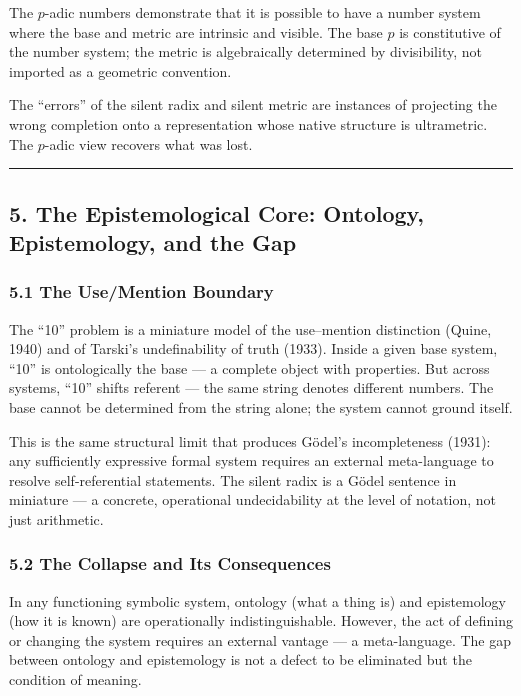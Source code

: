 \documentclass[
]{article}
\begin{document}
The \(p\)-adic numbers demonstrate that it is possible to have a number
system where the base and metric are intrinsic and visible. The base
\(p\) is constitutive of the number system; the metric is algebraically
determined by divisibility, not imported as a geometric convention.

The ``errors'' of the silent radix and silent metric are instances of
projecting the wrong completion onto a representation whose native
structure is ultrametric. The \(p\)-adic view recovers what was lost.

\begin{center}\rule{0.5\linewidth}{0.5pt}\end{center}

\subsection{5. The Epistemological Core: Ontology, Epistemology, and the
Gap}\label{the-epistemological-core-ontology-epistemology-and-the-gap}

\subsubsection{5.1 The Use/Mention
Boundary}\label{the-usemention-boundary}

The ``10'' problem is a miniature model of the use--mention distinction
(Quine, 1940) and of Tarski's undefinability of truth (1933). Inside a
given base system, ``10'' is ontologically the base --- a complete
object with properties. But across systems, ``10'' shifts referent ---
the same string denotes different numbers. The base cannot be determined
from the string alone; the system cannot ground itself.

This is the same structural limit that produces Gödel's incompleteness
(1931): any sufficiently expressive formal system requires an external
meta-language to resolve self-referential statements. The silent radix
is a Gödel sentence in miniature --- a concrete, operational
undecidability at the level of notation, not just arithmetic.

\subsubsection{5.2 The Collapse and Its
Consequences}\label{the-collapse-and-its-consequences}

In any functioning symbolic system, ontology (what a thing is) and
epistemology (how it is known) are operationally indistinguishable.
However, the act of defining or changing the system requires an external
vantage --- a meta-language. The gap between ontology and epistemology
is not a defect to be eliminated but the condition of meaning.
\end{document}
